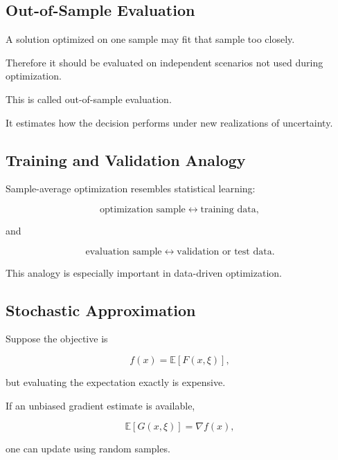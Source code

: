 \subsection{Out-of-Sample Evaluation}
\label{subsec:out-of-sample-evaluation-stochastic}

A solution optimized on one sample may fit that sample too closely.

Therefore it should be evaluated on independent scenarios not used during
optimization.

This is called out-of-sample evaluation.

It estimates how the decision performs under new realizations of
uncertainty.

\subsection{Training and Validation Analogy}
\label{subsec:training-validation-stochastic}

Sample-average optimization resembles statistical learning:

\[
\boxed{
\text{optimization sample}
\leftrightarrow
\text{training data},
}
\]

and

\[
\boxed{
\text{evaluation sample}
\leftrightarrow
\text{validation or test data}.
}
\]

This analogy is especially important in data-driven optimization.

\subsection{Stochastic Approximation}
\label{subsec:stochastic-approximation}

Suppose the objective is

\[
\boxed{
f(x)
=
\mathbb{E}
[
F(x,\xi)
],
}
\]

but evaluating the expectation exactly is expensive.

If an unbiased gradient estimate is available,

\[
\boxed{
\mathbb{E}
[
G(x,\xi)
]
=
\nabla f(x),
}
\]

one can update using random samples.

